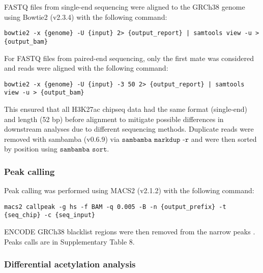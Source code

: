 FASTQ files from single-end sequencing were aligned to the GRCh38 genome using Bowtie2 (v2.3.4) with the following command:

\begin{lstlisting}[basicstyle=\ttfamily]
bowtie2 -x {genome} -U {input} 2> {output_report} | samtools view -u > {output_bam}
\end{lstlisting}

For FASTQ files from paired-end sequencing, only the first mate was considered and reads were aligned with the following command:

\begin{lstlisting}[basicstyle=\ttfamily]
bowtie2 -x {genome} -U {input} -3 50 2> {output_report} | samtools view -u > {output_bam}
\end{lstlisting}

This ensured that all H3K27ac \gls{chipseq} data had the same format (single-end) and length (52 bp) before alignment to mitigate possible differences in downstream analyses due to different sequencing methods.
Duplicate reads were removed with sambamba (v0.6.9) via $\texttt{sambamba markdup -r}$ and were then sorted by position using $\texttt{sambamba sort}$.

\subsubsection{Peak calling}

Peak calling was performed using MACS2 (v2.1.2) \cite{zhangModelbasedAnalysisChIPSeq2008} with the following command:

\begin{lstlisting}[basicstyle=\ttfamily]
macs2 callpeak -g hs -f BAM -q 0.005 -B -n {output_prefix} -t {seq_chip} -c {seq_input}\end{lstlisting}

ENCODE GRCh38 blacklist regions were then removed from the narrow peaks \cite{amemiyaENCODEBlacklistIdentification2019}.
Peaks calls are in Supplementary Table 8.

\subsubsection{Differential acetylation analysis}

